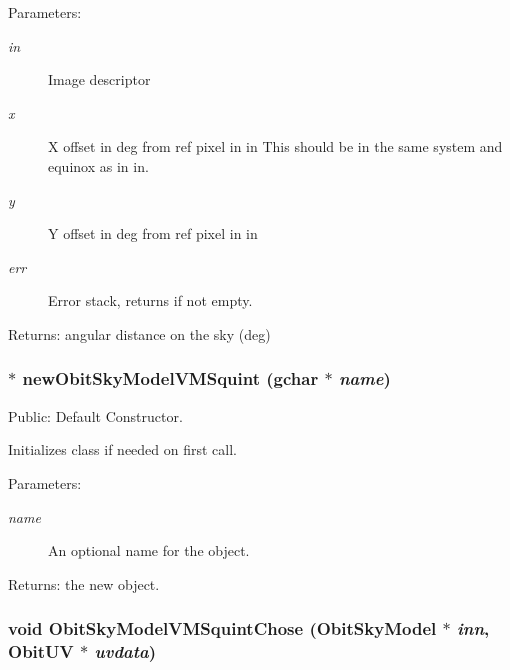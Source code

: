 \begin{Desc}
\item[Parameters:]
\begin{description}
\item[{\em in}]Image descriptor \item[{\em x}]X offset in deg from ref pixel in in This should be in the same system and equinox as in in. \item[{\em y}]Y offset in deg from ref pixel in in \item[{\em err}]Error stack, returns if not empty. \end{description}
\end{Desc}
\begin{Desc}
\item[Returns:]angular distance on the sky (deg) \end{Desc}
\subsubsection{$\ast$ new\-Obit\-Sky\-Model\-VMSquint (gchar $\ast$ {\em name})}\label{ObitSkyModelVMSquint_8c_a14}


Public: Default Constructor. 

Initializes class if needed on first call. \begin{Desc}
\item[Parameters:]
\begin{description}
\item[{\em name}]An optional name for the object. \end{description}
\end{Desc}
\begin{Desc}
\item[Returns:]the new object. \end{Desc}
\subsubsection{\setlength{\rightskip}{0pt plus 5cm}void Obit\-Sky\-Model\-VMSquint\-Chose ({\bf Obit\-Sky\-Model} $\ast$ {\em inn}, {\bf Obit\-UV} $\ast$ {\em uvdata})}\label{ObitSkyModelVMSquint_8c_a25}


